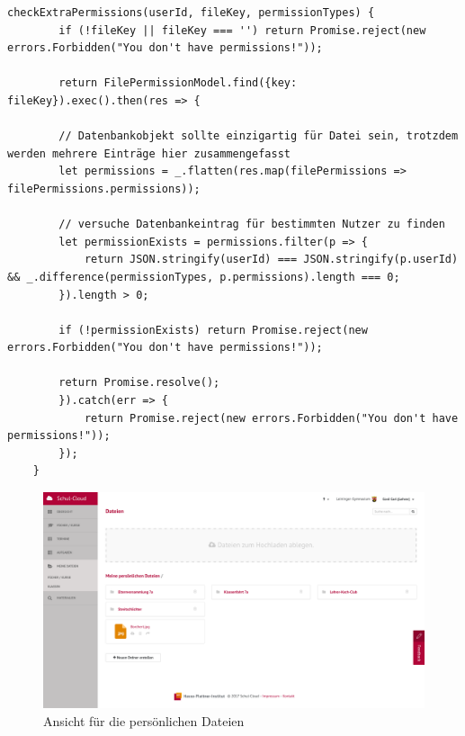 \begin{lstlisting}[caption=checkExtraPermissions() Funktion des filePermissionHelper, label=code:fphextra]
	checkExtraPermissions(userId, fileKey, permissionTypes) {
		if (!fileKey || fileKey === '') return Promise.reject(new errors.Forbidden("You don't have permissions!"));
	
		return FilePermissionModel.find({key: fileKey}).exec().then(res => {
		
		// Datenbankobjekt sollte einzigartig für Datei sein, trotzdem werden mehrere Einträge hier zusammengefasst
		let permissions = _.flatten(res.map(filePermissions => filePermissions.permissions));
	
		// versuche Datenbankeintrag für bestimmten Nutzer zu finden
		let permissionExists = permissions.filter(p => {
			return JSON.stringify(userId) === JSON.stringify(p.userId) && _.difference(permissionTypes, p.permissions).length === 0;
		}).length > 0;
	
		if (!permissionExists) return Promise.reject(new errors.Forbidden("You don't have permissions!"));
	
		return Promise.resolve();
		}).catch(err => {
			return Promise.reject(new errors.Forbidden("You don't have permissions!"));
		});
	}
\end{lstlisting}

\begin{figure}[H]
	\centering
	\includegraphics[width=1\linewidth]{images/screenMeineDateien}
	\caption{Ansicht für die persönlichen Dateien}
	\label{fig:screenMeineDateien}
\end{figure}

